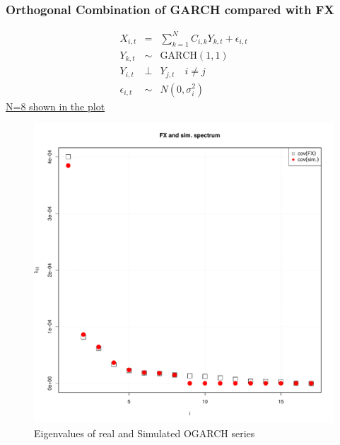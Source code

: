 \documentclass{beamer}
\begin{document}
\begin{frame}
  \frametitle{Orthogonal Combination of GARCH compared with FX}
  \begin{minipage}{0.6\linewidth}
    \begin{scriptsize}
      \begin{eqnarray*}
        X_{i, t} &=& \sum_{k=1}^N C_{i,k} Y_{k, t} + \epsilon_{i, t} \\
        Y_{k, t} &\sim& \text{GARCH}(1,1) \\
        Y_{i, t} &\bot& Y_{j, t} \quad i \neq j\\
        \epsilon_{i,t} &\sim& N(0, \sigma_i^2)
      \end{eqnarray*}
      \underline{N=8 shown in the plot}
    \end{scriptsize}
  \end{minipage}\hfill
  \begin{minipage}{0.4\linewidth}
    \begin{figure}[htb!]
      \centering
      \includegraphics[width=1.0\linewidth]{FX_OGARCH_eigenvalues.pdf}
      \caption{\scriptsize Eigenvalues of real and Simulated OGARCH series}
    \end{figure}
  \end{minipage}
\end{frame}
\end{document}
